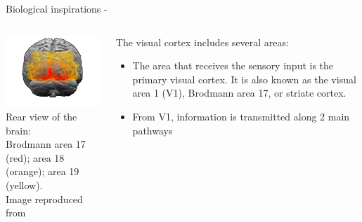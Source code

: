 \begin{frame}[t,allowframebreaks]{Biological inspirations - }
    \begin{columns}
        \begin{column}{0.38\textwidth}
         \begin{center}
          \includegraphics[width=1.0\textwidth]
          {./images/biological_inspirations/brodmann_areas_17_18_19.png}\\
          {\scriptsize 
          Rear view of the brain:\\
          Brodmann area 17 (red); area 18 (orange); area 19 (yellow).\\
          \color{col:attribution} 
          Image reproduced from \cite{Wikipedia:VisualCortex}}\\
         \end{center}
        \end{column}
        \begin{column}{0.62\textwidth}
            \vspace{0.2cm}
            \small
            The visual cortex includes several areas:
            \begin{itemize}
                \small
                \item The area that receives the sensory input is  
                 the \gls{primary visual cortex}. 
                 It is also known as the
                  \gls{visual area 1 (V1)}, 
                  \gls{Brodmann area 17}, or 
                  \gls{striate cortex}.
                \item
                 From V1, information is transmitted along 2 main pathways

\end{itemize}
\end{column}
\end{columns}
\end{frame}
